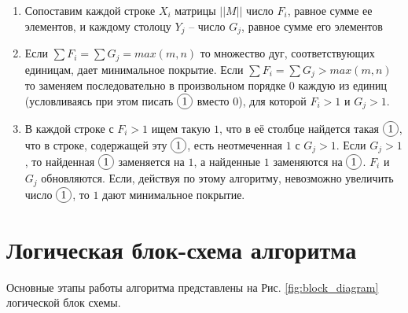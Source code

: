 \documentclass[12pt]{article}
\newcommand*\circled[1]{\tikz[baseline=(char.base)]{
            \node[shape=circle,draw,inner sep=2pt] (char) {#1};}}
\begin{document}
\begin{enumerate}
    \item Сопоставим каждой строке $X_i$ матрицы $||M||$
          число $F_i$, равное сумме ее элементов,
          и каждому столоцу $Y_j$ – число $G_j$, равное сумме
          его элементов
    \item Если $\sum F_i = \sum G_j = max(m, n)$ то
          множество дуг, соответствующих единицам,
          дает минимальное покрытие. Если
          $\sum F_i = \sum G_j > max(m, n)$
          то заменяем последовательно
          в произвольном порядке $0$ каждую из единиц
          (условливаясь при этом писать $\circled{1}$ вместо $0$),
          для которой $F_i > 1$ и $G_j > 1$.
    \item В каждой строке с $F_i > 1$ ищем такую
          $1$, что в её столбце найдется
          такая $\circled{1}$, что в строке,
          содержащей эту $\circled{1}$, есть неотмеченная $1$
          с $G_j > 1$. Если $G_j > 1$, то найденная $\circled{1}$
          заменяется на $1$, а найденные $1$ заменяются на
          $\circled{1}$. $F_i$ и $G_j$ обновляются.
          Если, действуя по этому алгоритму,
          невозможно увеличить число $\circled{1}$,
          то $1$ дают минимальное покрытие.
\end{enumerate}

\section{Логическая блок-схема алгоритма}

Основные этапы работы алгоритма представлены на
Рис. \ref{fig:block_diagram} логической блок
схемы.
\end{document}
